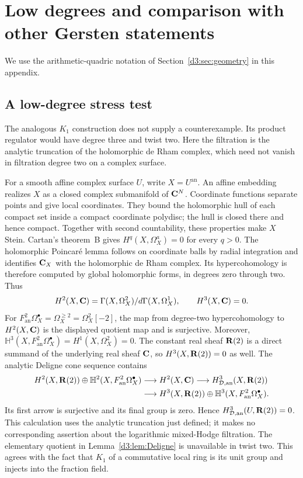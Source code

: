 \section{Low degrees and comparison with other Gersten statements}\label{d3:sec:comparisons}
We use the arithmetic-quadric notation of Section~\ref{d3:sec:geometry} in this appendix.

\subsection{A low-degree stress test}
The analogous $K_1$ construction does not supply a counterexample.
Its product regulator would have degree three and twist two.
Here the filtration is the analytic truncation of the holomorphic
de Rham complex, which need not vanish in filtration degree two
on a complex surface.

For a smooth affine complex surface $U$, write $X=U^{\mathrm{an}}$.
An affine embedding realizes $X$ as a closed complex submanifold
of $\mathbf C^N$. Coordinate functions separate points and give local
coordinates. They bound the holomorphic hull of each compact set
inside a compact coordinate polydisc; the hull is closed there
and hence compact. Together with second countability, these
properties make $X$ Stein.
Cartan's theorem~B
\cite[\S5, proof of Theorem~B, pp.~19-14--19-15]{CartanStein1952}
gives $H^q(X,\Omega_X^a)=0$ for every $q>0$.
The holomorphic Poincar\'e lemma follows on coordinate balls by
radial integration and identifies $\mathbf C_X$ with the holomorphic
de Rham complex. Its hypercohomology is therefore computed by
global holomorphic forms, in degrees zero through two. Thus
\[
 H^2(X,\mathbf C)=\Gamma(X,\Omega_X^2)/d\Gamma(X,\Omega_X^1),
 \qquad H^3(X,\mathbf C)=0.
\]
For
$F^2_{\mathrm{an}}\Omega_X^\bullet=\Omega_X^{\ge2}
=\Omega_X^2[-2]$, the map from degree-two hypercohomology to
$H^2(X,\mathbf C)$ is the displayed quotient map and is surjective.
Moreover,
$\mathbb H^3(X,F^2_{\mathrm{an}}\Omega_X^\bullet)
=H^1(X,\Omega_X^2)=0$.
The constant real sheaf $\mathbf R(2)$ is a direct summand of the
underlying real sheaf $\mathbf C$, so $H^3(X,\mathbf R(2))=0$ as well.
The analytic Deligne cone sequence contains
\[
\begin{split}
 H^2(X,\mathbf R(2))\oplus
 \mathbb H^2(X,F^2_{\mathrm{an}}\Omega_X^\bullet)
 &\longrightarrow H^2(X,\mathbf C)\longrightarrow H_{\mathcal D,\mathrm{an}}^3(X,\mathbf R(2))\\
 &\longrightarrow H^3(X,\mathbf R(2))\oplus
 \mathbb H^3(X,F^2_{\mathrm{an}}\Omega_X^\bullet).
\end{split}
\]
Its first arrow is surjective and its final group is zero.
Hence $H_{\mathcal D,\mathrm{an}}^3(U,\mathbf R(2))=0$.
This calculation uses the analytic truncation just defined;
it makes no corresponding assertion about the logarithmic
mixed-Hodge filtration.
The elementary quotient in Lemma~\ref{d3:lem:Deligne} is
unavailable in twist two. This agrees with the fact that $K_1$
of a commutative local ring is its unit group and injects into
the fraction field.

